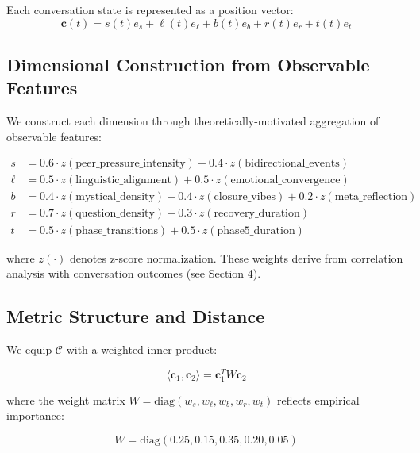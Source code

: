 \documentclass[11pt,letterpaper]{article}
\begin{document}
Each conversation state is represented as a position vector:
\begin{equation}
\mathbf{c}(t) = s(t)e_s + \ell(t)e_\ell + b(t)e_b + r(t)e_r + t(t)e_t
\end{equation}

\subsection{Dimensional Construction from Observable Features}

We construct each dimension through theoretically-motivated aggregation of observable features:

\begin{align}
s &= 0.6 \cdot z(\text{peer\_pressure\_intensity}) + 0.4 \cdot z(\text{bidirectional\_events}) \\
\ell &= 0.5 \cdot z(\text{linguistic\_alignment}) + 0.5 \cdot z(\text{emotional\_convergence}) \\
b &= 0.4 \cdot z(\text{mystical\_density}) + 0.4 \cdot z(\text{closure\_vibes}) + 0.2 \cdot z(\text{meta\_reflection}) \\
r &= 0.7 \cdot z(\text{question\_density}) + 0.3 \cdot z(\text{recovery\_duration}) \\
t &= 0.5 \cdot z(\text{phase\_transitions}) + 0.5 \cdot z(\text{phase5\_duration})
\end{align}

where $z(\cdot)$ denotes z-score normalization. These weights derive from correlation analysis with conversation outcomes (see Section 4).

\subsection{Metric Structure and Distance}

We equip $\mathcal{C}$ with a weighted inner product:

\begin{equation}
\langle \mathbf{c}_1, \mathbf{c}_2 \rangle = \mathbf{c}_1^T W \mathbf{c}_2
\end{equation}

where the weight matrix $W = \text{diag}(w_s, w_\ell, w_b, w_r, w_t)$ reflects empirical importance:

\begin{equation}
W = \text{diag}(0.25, 0.15, 0.35, 0.20, 0.05)
\end{equation}
\end{document}
